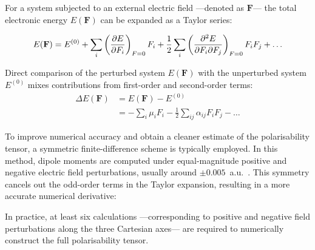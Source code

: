 \vspace{1em}%
For a system subjected to an external electric field ---denoted
as $\mathbf{F}$--- the total electronic energy $E(\mathbf{F})$ can be expanded
as a Taylor series:%

\begin{align}
  E(\mathbf{F}) = E^{(0)} + \sum_i\left(\pdv{E}{F_i}\right)_{F=0} F_i
    + \frac12\sum_{i}\left(\pdv[2]{E}{F_i}{F_j}\right)_{F=0} F_i F_j + \ldots
\end{align}

\newpage
Direct comparison of the perturbed system $E(\mathbf{F})$ with the
unperturbed system $E^{(0)}$ mixes contributions from first-order
and second-order terms:
%
\begin{align}
  \Delta E(\mathbf{F}) &= E(\mathbf{F}) - E^{(0)} \\
    &= -\sum_i\mu_iF_i -\frac12 \sum_{ij}\alpha_{ij}F_iF_j - \ldots
\end{align}

To improve numerical accuracy and obtain a cleaner estimate of the
polarisability tensor, a symmetric finite-difference scheme is typically
employed. In this method, dipole moments are computed under equal-magnitude
positive and negative electric field perturbations, usually around
$\pm 0.005$~a.u.~\cite{macchiEleD}. This symmetry cancels out the odd-order
terms in the Taylor expansion, resulting in a more accurate numerical
derivative:


In practice, at least six calculations ---corresponding to positive
and negative field perturbations along the three Cartesian axes--- are required to
numerically construct the full polarisability tensor.

